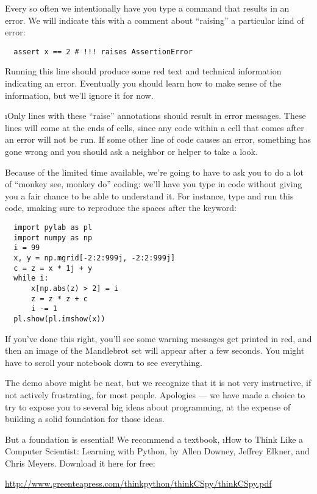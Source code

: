 \documentclass[letterpaper, 12pt, titlepage, twoside]{article}
\begin{document}
Every so often we intentionally have you type a command that results in an
error. We will indicate this with a comment about ``raising'' a particular
kind of error:

\begin{lstlisting}
  assert x == 2 # !!! raises AssertionError
\end{lstlisting}

Running this line should produce some red text and technical information
indicating an error. Eventually you should learn how to make sense of the
information, but we'll ignore it for now.

\i{Only} lines with these ``raise'' annotations should result in error
messages. These lines will come at the ends of cells, since any code within a
cell that comes after an error will not be run. If some other line of code
causes an error, something has gone wrong and you should ask a neighbor or
helper to take a look.

Because of the limited time available, we're going to have to ask you to do a
lot of ``monkey see, monkey do'' coding: we'll have you type in code without
giving you a fair chance to be able to understand it. For instance, type and
run this code, \i{making sure to reproduce the spaces after the 
  keyword}:

\begin{lstlisting}
  import pylab as pl
  import numpy as np
  i = 99
  x, y = np.mgrid[-2:2:999j, -2:2:999j]
  c = z = x * 1j + y
  while i:
      x[np.abs(z) > 2] = i
      z = z * z + c
      i -= 1
  pl.show(pl.imshow(x))
\end{lstlisting}

If you've done this right, you'll see some warning messages get printed in
red, and then an image of the Mandlebrot set will appear after a few seconds.
You might have to scroll your notebook down to see everything.

The demo above might be neat, but we recognize that it is not very
instructive, if not actively frustrating, for most people. Apologies --- we
have made a choice to try to expose you to several big ideas about
programming, at the expense of building a solid foundation for those ideas.

But a foundation is essential! We recommend a textbook, \i{How to Think Like a
  Computer Scientist: Learning with Python}, by Allen Downey, Jeffrey Elkner,
and Chris Meyers. Download it here for free:

\begin{center}
  \url{http://www.greenteapress.com/thinkpython/thinkCSpy/thinkCSpy.pdf}
\end{center}
\end{document}
